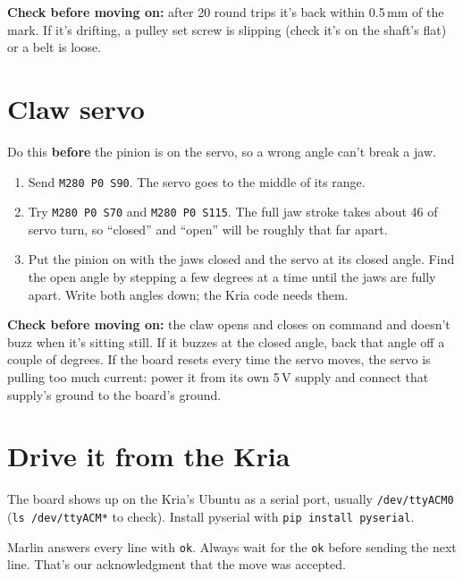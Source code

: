 \documentclass[10pt]{article}
\newcommand{\mm}{\,mm}
\newcommand{\file}[1]{\texttt{#1}}
\newcommand{\gcode}[1]{\texttt{#1}}
\newcommand{\gate}[1]{\par\smallskip\noindent\colorbox{okgreen!10}{\parbox{\dimexpr\linewidth-2\fboxsep}{\textcolor{okgreen}{\textbf{Check before moving on:}} #1}}\par\smallskip}
\begin{document}
\gate{after 20 round trips it's back within 0.5\mm{} of the mark. If it's drifting, a pulley set
screw is slipping (check it's on the shaft's flat) or a belt is loose.}

\section{Claw servo}

Do this \textbf{before} the pinion is on the servo, so a wrong angle can't break a jaw.

\begin{enumerate}
  \item Send \gcode{M280 P0 S90}. The servo goes to the middle of its range.
  \item Try \gcode{M280 P0 S70} and \gcode{M280 P0 S115}. The full jaw stroke takes about
        46\textdegree{} of servo turn, so ``closed'' and ``open'' will be roughly that far apart.
  \item Put the pinion on with the jaws closed and the servo at its closed angle. Find the open
        angle by stepping a few degrees at a time until the jaws are fully apart. Write both angles
        down; the Kria code needs them.
\end{enumerate}

\gate{the claw opens and closes on command and doesn't buzz when it's sitting still. If it buzzes
at the closed angle, back that angle off a couple of degrees. If the board resets every time the
servo moves, the servo is pulling too much current: power it from its own 5\,V supply and connect
that supply's ground to the board's ground.}

\section{Drive it from the Kria}

The board shows up on the Kria's Ubuntu as a serial port, usually \file{/dev/ttyACM0}
(\texttt{ls /dev/ttyACM*} to check). Install pyserial with \texttt{pip install pyserial}.

Marlin answers every line with \texttt{ok}. Always wait for the \texttt{ok} before sending the
next line. That's our acknowledgment that the move was accepted.
\end{document}
